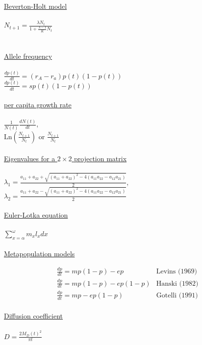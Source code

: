 \documentclass[11pt, oneside, twocolumn]{article} 	%
\begin{document}
\underline{Beverton-Holt model}
\\
\\
$N_{t+1} = \frac{\lambda N_t}{1 + \frac{\lambda -1}{K}N_t}$
\\
\\
\\


\underline{Allele frequency}
\\
\\
$ \frac{dp(t)}{dt} = (r_A - r_a)p(t)(1-p(t))$ \\
$  \frac{dp(t)}{dt} = sp(t)(1-p(t))$
\\
\\

\underline{per capita growth rate}
\\
\\
$ \frac{1}{N(t)} \frac{dN(t)}{dt}$,\\
$ \mbox{Ln}\left(\frac{N_{t+1}}{N_t}\right)$ or $\frac{N_{t+1}}{N_t}$
\\
\\

\underline{Eigenvalues for a $2 \times 2$ projection matrix}
\\
\\
$\lambda_1 = \frac{a_{11} + a_{22} + \sqrt{(a_{11} + a_{22})^2 - 4(a_{11}a_{22}-a_{12}a_{21})}}{2}$,\\
$\lambda_2 = \frac{a_{11} + a_{22} - \sqrt{(a_{11} + a_{22})^2 - 4(a_{11}a_{22}-a_{12}a_{21})}}{2}$
\\
\\

\underline{Euler-Lotka equation}
\\
\\
$\sum_{x=\alpha}^\omega m_x l_x dx$
\\
\\
\underline{Metapopulation models}

\[
\begin{array}{ll}
\frac{dp}{dt} = mp(1-p) - ep & \mbox{Levins (1969)}\\
\frac{dp}{dt} = mp(1-p) - ep(1-p) & \mbox{Hanski (1982)}\\
\frac{dp}{dt} = mp - ep(1-p) & \mbox{Gotelli (1991)}\\
\end{array}
\]

\underline{Diffusion coefficient}
\\
\\
$D = \frac{2 M_D(t)^2}{\pi t}$
\\
\\
\end{document}
